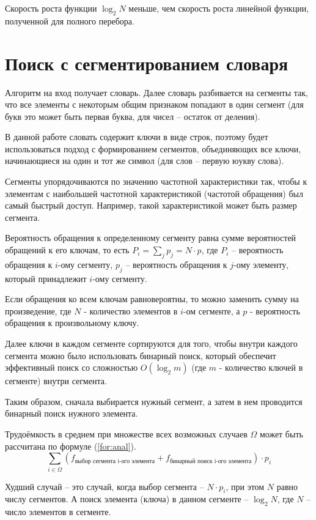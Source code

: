 Скорость роста функции $\log_2 N$ меньше, чем скорость роста линейной функции, полученной для полного перебора.

\section{Поиск с сегментированием словаря}
Алгоритм на вход получает словарь. Далее словарь разбивается на сегменты так, что все элементы с некоторым общим признаком попадают в один сегмент (для букв это может быть первая буква, для чисел -- остаток от деления).

В данной работе словать содержит ключи в виде строк, поэтому будет использоваться подход с формированием сегментов, объединяющих все ключи, начинающиеся на один и тот же символ (для слов -- первую юукву слова).

Сегменты упорядочиваются по значению частотной характеристики так, чтобы к элементам с наибольшей частотной характеристикой (частотой обращения) был самый быстрый доступ.
Например, такой характеристикой может быть размер сегмента.

Вероятность обращения к определенному сегменту равна сумме вероятностей обращений к его ключам, то есть $P_i = \sum_{j}p_j = N \cdot p$, где $P_i$ -- вероятность обращения к $i$-ому сегменту, $p_j$ -- вероятность обращения к $j$-ому элементу, который принадлежит $i$-ому сегменту. 

Если обращения ко всем ключам равновероятны, то можно заменить сумму на произведение, где $N$ - количество элементов в $i$-ом сегменте, а $p$ - вероятность обращения к произвольному ключу.

Далее ключи в каждом сегменте сортируются для того, чтобы внутри каждого сегмента можно было использовать бинарный поиск, который обеспечит эффективный поиск со сложностью $O(\log_2 m)$ (где $m$ - количество ключей в сегменте) внутри сегмента.

Таким образом, сначала выбирается нужный сегмент, а затем в нем проводится бинарный поиск нужного элемента.

Трудоёмкость в среднем при множестве всех возможных случаев $\Omega$ может быть рассчитана по формуле (\ref{for:anal}). 
\begin{equation}
\label{for:anal}
\sum_{i \in \Omega}{\left(f_{\text{выбор сегмента i-ого элемента}} + f_{\text{бинарный поиск i-ого элемента}}\right)} \cdot p_i
\end{equation}

Худший случай -- это случай, когда выбор сегмента -- $N \cdot p_i$, при этом $N$ равно числу сегментов. А поиск элемента (ключа) в данном сегменте -- $\log_2 N$, где $N$ -- число элементов в сегменте.

